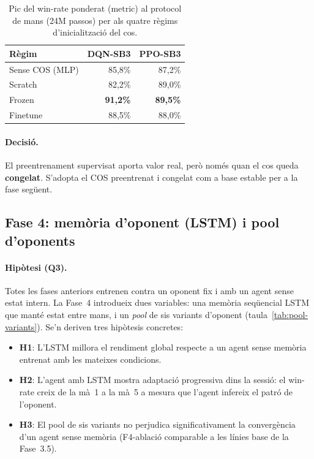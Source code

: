 \begin{table}[H]
  \centering
  \begin{tabular}{lrr}
    \toprule
    Règim & DQN-SB3 & PPO-SB3 \\
    \midrule
    Sense COS (\ac{MLP}) & 85{,}8\% & 87{,}2\% \\
    Scratch              & 82{,}2\% & 89{,}0\% \\
    Frozen               & \textbf{91{,}2\%} & \textbf{89{,}5\%} \\
    Finetune             & 88{,}5\% & 88{,}0\% \\
    \bottomrule
  \end{tabular}
  \caption{Pic del win-rate ponderat (\(\text{metric}\)) al protocol de mans (24M passos)
           per als quatre règims d'inicialització del cos.}
  \label{tab:fase35}
\end{table}

\paragraph{Decisió.} El preentrenament supervisat aporta valor real, però només quan el
cos queda \textbf{congelat}. S'adopta el COS preentrenat i congelat com a base
estable per a la fase següent.

\subsection{Fase 4: memòria d'oponent (LSTM) i pool d'oponents}
\label{sec:fase4}

\paragraph{Hipòtesi (Q3).} Totes les fases anteriors entrenen contra un oponent fix i amb
un agent sense estat intern. La Fase~4 introdueix dues variables: una memòria seqüencial \acf{LSTM}
que manté estat entre mans, i un \emph{pool} de sis variants d'oponent
(taula~\ref{tab:pool-variants}). Se'n deriven tres hipòtesis concretes:
\begin{itemize}
  \item \textbf{H1}: L'\ac{LSTM} millora el rendiment global respecte a un agent sense
        memòria entrenat amb les mateixes condicions.
  \item \textbf{H2}: L'agent amb \ac{LSTM} mostra adaptació progressiva dins la sessió:
        el win-rate creix de la mà~1 a la mà~5 a mesura que l'agent infereix el patró de
        l'oponent.
  \item \textbf{H3}: El pool de sis variants no perjudica significativament la convergència
        d'un agent sense memòria (F4-ablació comparable a les línies base de la Fase~3.5).
\end{itemize}

